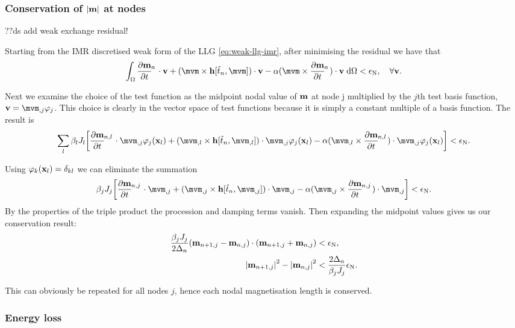 \subsubsection{Conservation of $\left|{\mathbf{m}} \right|$ at nodes}
\label{sec:weak-cons-absmv}

??ds add weak exchange residual!

Starting from the IMR discretised weak form of the LLG \eqref{eq:weak-llg-imr}, after minimising the residual we have that
\begin{equation}
  \intd{\dmdtm \cdot \testv + (\mvm \times \hv[\tm, \mvm]) \cdot \testv - \dampc (\mvm \times \dmdtm) \cdot \testv } < \ntol, \quad \forall \testv .
\end{equation}

Next we examine the choice of the test function as the midpoint nodal value of $\mathbf{m}$ at node j multiplied by the $j$th test basis function, $\testv = \mvm_{,j} \tbf_j$.
This choice is clearly in the vector space of test functions because it is simply a constant multiple of a basis function.
The result is
\begin{equation}
  \sum_l \beta_l \jstox_l \bigs{\dmdtml \cdot \mvm_{,j}\tbf_j(\xv_l) + (\mvm_{,l} \times \hv[\tm, \mvm_{,l}]) \cdot \mvm_{,j}\tbf_j(\xv_l) - \dampc (\mvm_{,l} \times \dmdtml) \cdot \mvm_{,j}\tbf_j(\xv_l)} < \ntol.
\end{equation}

Using $\varphi_k(\mathbf{x}_l) = \delta_{kl}$ we can eliminate the summation
\begin{equation}
  \beta_j \jstox_j \bigs{\dmdtmj \cdot \mvm_{,j} + (\mvm_{,j} \times \hv[\tm, \mvm_{,j}]) \cdot \mvm_{,j} - \dampc (\mvm_{,j} \times \dmdtmj) \cdot \mvm_{,j}} < \ntol.
\end{equation}
By the properties of the triple product the procession and damping terms vanish. Then expanding the midpoint values gives us our conservation result:
\begin{equation}
  \begin{aligned}
    \frac{\beta_j J_j}{2\Delta_{n}}(\mathbf{m}_{n+1,j} - \mathbf{m}_{n,j}) \cdot (\mathbf{m}_{n+1, j} + \mathbf{m}_{n, j}) &< \epsilon_{\text{N}}, \\
    \left|{\mathbf{m}_{n+1, j}} \right|^2 - \left|{\mathbf{m}_{n, j}} \right|^2 &< \frac{2\Delta_{n}}{\beta_j J_j}\epsilon_{\text{N}}.
  \end{aligned}
\end{equation}

This can obviously be repeated for all nodes $j$, hence each nodal magnetisation length is conserved.


\subsubsection{Energy loss}

